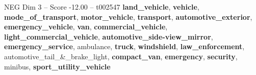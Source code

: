 \begin{textsample}{NEG Dim 3 – Score -12.00 – t002547}  \label{ex:f3_neg_005}
\textbf{land\_vehicle}, \textbf{vehicle}, \textbf{mode\_of\_transport}, \textbf{motor\_vehicle}, \textbf{transport}, \textbf{automotive\_exterior}, \textbf{emergency\_vehicle}, \textbf{van}, \textbf{commercial\_vehicle}, \textbf{light\_commercial\_vehicle}, \textbf{automotive\_side-view\_mirror}, \textbf{emergency\_service}, ambulance, \textbf{truck}, \textbf{windshield}, \textbf{law\_enforcement}, automotive\_tail\_\&\_brake\_light, \textbf{compact\_van}, \textbf{emergency}, \textbf{security}, minibus, \textbf{sport\_utility\_vehicle}

\end{textsample}
